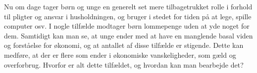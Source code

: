 Nu om dage tager børn og unge en generelt set mere tilbagetrukket rolle i forhold til pligter og ansvar i husholdningen, og bruger i stedet for tiden på at lege, spille computer osv\cite{Boerneliv}. I nogle tilfælde modtager børn lommepenge uden at yde noget for dem. Samtidigt kan man se, at unge ender med at have en manglende basal viden og forståelse for økonomi, og at antallet af disse tilfælde er stigende\cite{BusinessDK2}. Dette kan medføre, at der er flere som ender i økonomiske vanskeligheder, som gæld og overforbrug. Hvorfor er alt dette tilfældet, og hvordan kan man bearbejde det?